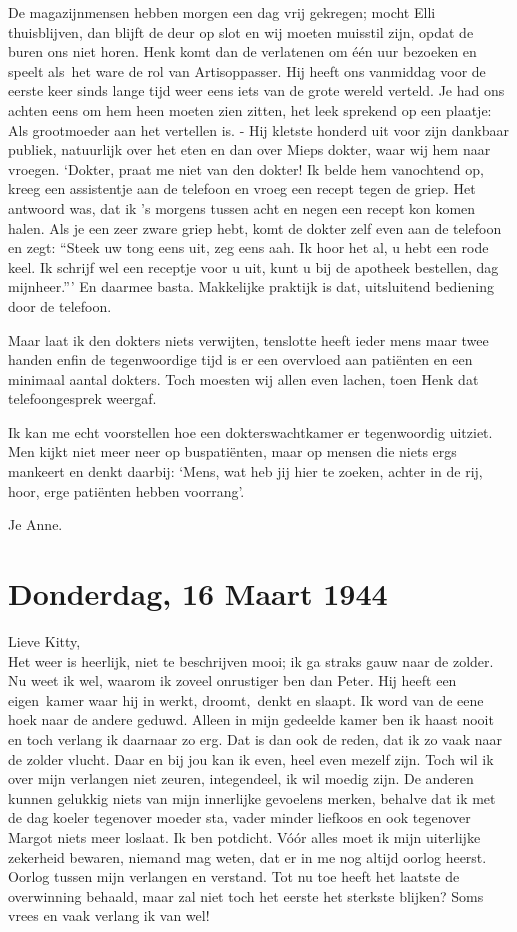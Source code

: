\documentclass{book}
\begin{document}
De magazijnmensen hebben morgen een dag vrij gekregen; mocht Elli thuisblijven,
dan blijft de deur op slot en wij moeten muisstil zijn, opdat de buren ons niet
horen. Henk komt dan de verlatenen om één uur bezoeken en speelt als~het ware de
rol van Artisoppasser. Hij heeft ons vanmiddag voor de eerste keer sinds lange
tijd weer eens iets van de grote wereld verteld. Je had ons achten eens om hem
heen moeten zien zitten, het leek sprekend op een plaatje: Als grootmoeder aan
het vertellen is. - Hij kletste honderd uit voor zijn dankbaar publiek,
natuurlijk over het eten en dan over Mieps dokter, waar wij hem naar vroegen.
`Dokter, praat me niet van den dokter! Ik belde hem vanochtend op, kreeg een
assistentje aan de telefoon en vroeg een recept tegen de griep. Het antwoord
was, dat ik 's morgens tussen acht en negen een recept kon komen halen. Als je
een zeer zware griep hebt, komt de dokter zelf even aan de telefoon en zegt:
``Steek uw tong eens uit, zeg eens aah. Ik hoor het al, u hebt een rode keel. Ik
schrijf wel een receptje voor u uit, kunt u bij de apotheek bestellen, dag
mijnheer.''' En daarmee basta. Makkelijke praktijk is dat, uitsluitend bediening
door de telefoon.

Maar laat ik den dokters niets verwijten, tenslotte heeft ieder mens maar twee
handen enfin de tegenwoordige tijd is er een overvloed aan patiënten en een
minimaal aantal dokters. Toch moesten wij allen even lachen, toen Henk dat
telefoongesprek weergaf.

Ik kan me echt voorstellen hoe een dokterswachtkamer er tegenwoordig uitziet.
Men kijkt niet meer neer op buspatiënten, maar op mensen die niets ergs mankeert
en denkt daarbij: `Mens, wat heb jij hier te zoeken, achter in de rij, hoor,
erge patiënten hebben voorrang'.

Je Anne.

\section*{Donderdag, 16 Maart 1944}

Lieve Kitty,\\
Het weer is heerlijk, niet te beschrijven mooi; ik ga straks gauw
naar de zolder. Nu weet ik wel, waarom ik zoveel onrustiger ben dan Peter. Hij
heeft een eigen~kamer waar hij in werkt, droomt,~denkt en slaapt. Ik word van de
eene hoek naar de andere geduwd.  Alleen in mijn gedeelde kamer ben ik haast
nooit en toch verlang ik daarnaar zo erg. Dat is dan ook de reden, dat ik zo
vaak naar de zolder vlucht. Daar en bij jou kan ik even, heel even mezelf zijn.
Toch wil ik over mijn verlangen niet zeuren, integendeel, ik wil moedig zijn. De
anderen kunnen gelukkig niets van mijn innerlijke gevoelens merken, behalve dat
ik met de dag koeler tegenover moeder sta, vader minder liefkoos en ook
tegenover Margot niets meer loslaat. Ik ben potdicht.  Vóór alles moet ik mijn
uiterlijke zekerheid bewaren, niemand mag weten, dat er in me nog altijd oorlog
heerst. Oorlog tussen mijn verlangen en verstand. Tot nu toe heeft het laatste
de overwinning behaald, maar zal niet toch het eerste het sterkste blijken? Soms
vrees en vaak verlang ik van wel!
\end{document}
